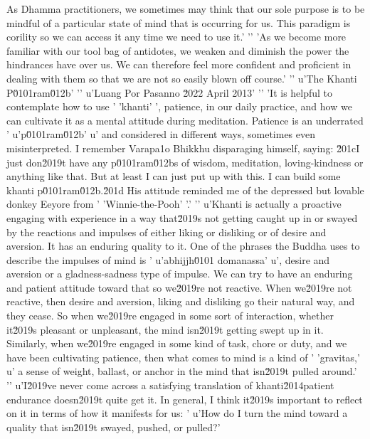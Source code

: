As Dhamma practitioners, we sometimes may think that our sole purpose 
is to be mindful of a particular state of mind that is occurring for 
us. This paradigm is corility so we can access it any time we need to use it.'
'\n'
'As we become more familiar with our tool bag of antidotes, we weaken and diminish the power the hindrances have over us. We can therefore feel more confident and proficient in dealing with them so that we are not so easily blown off course.'
'\n'
u'The Khanti P\u0101ram\u012b'
'\n'
u'Luang Por Pasanno \u2022 April 2013'
'\n'
'It is helpful to contemplate how to use '
'khanti'
', patience, in our daily practice, and how we can cultivate it as a mental attitude during meditation. Patience is an underrated '
u'p\u0101ram\u012b'
u' and considered in different ways, sometimes even misinterpreted. I remember Varapa\xf1o Bhikkhu disparaging himself, saying: \u201cI just don\u2019t have any p\u0101ram\u012bs of wisdom, meditation, loving-kindness or anything like that. But at least I can just put up with this. I can build some khanti p\u0101ram\u012b.\u201d His attitude reminded me of the depressed but lovable donkey Eeyore from '
'Winnie-the-Pooh'
'.'
'\n'
u'Khanti is actually a proactive engaging with experience in a way that\u2019s not getting caught up in or swayed by the reactions and impulses of either liking or disliking or of desire and aversion. It has an enduring quality to it. One of the phrases the Buddha uses to describe the impulses of mind is '
u'abhijjh\u0101 domanassa'
u', desire and aversion or a gladness-sadness type of impulse. We can try to have an enduring and patient attitude toward that so we\u2019re not reactive. When we\u2019re not reactive, then desire and aversion, liking and disliking go their natural way, and they cease. So when we\u2019re engaged in some sort of interaction, whether it\u2019s pleasant or unpleasant, the mind isn\u2019t getting swept up in it. Similarly, when we\u2019re engaged in some kind of task, chore or duty, and we have been cultivating patience, then what comes to mind is a kind of '
'gravitas,'
u' a sense of weight, ballast, or anchor in the mind that isn\u2019t pulled around.'
'\n'
u'I\u2019ve never come across a satisfying translation of khanti\u2014patient endurance doesn\u2019t quite get it. In general, I think it\u2019s important to reflect on it in terms of how it manifests for us: '
u'How do I turn the mind toward a quality that isn\u2019t swayed, pushed, or pulled?'
